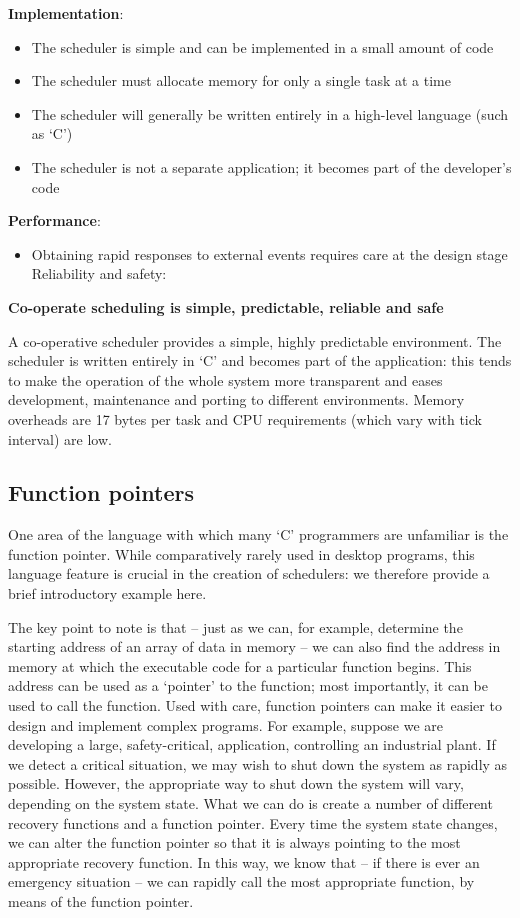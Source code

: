 \documentclass[twoside, final]{hcmut_report}
\begin{document}
\textbf{Implementation}:
\begin{itemize}
    \item The scheduler is simple and can be implemented in a small amount of code
    \item The scheduler must allocate memory for only a single task at a time
    \item The scheduler will generally be written entirely in a high-level language (such as ‘C’)
   \item The scheduler is not a separate application; it becomes part of the developer’s code
\end{itemize}


\textbf{Performance}:
\begin{itemize}
    \item Obtaining rapid responses to external events requires care at the design stage
Reliability and safety:

\end{itemize}

\textbf{Co-operate scheduling is simple, predictable, reliable and safe}

A co-operative scheduler provides a simple, highly predictable environment. The
scheduler is written entirely in ‘C’ and becomes part of the application: this tends to
make the operation of the whole system more transparent and eases development,
maintenance and porting to different environments. Memory overheads are 17
bytes per task and CPU requirements (which vary with tick interval) are low.

\subsection{Function pointers}
One area of the language with which many `C' programmers are unfamiliar is the
function pointer. While comparatively rarely used in desktop programs, this language
feature is crucial in the creation of schedulers: we therefore provide a brief introductory example here.

The key point to note is that – just as we can, for example, determine the starting
address of an array of data in memory – we can also find the address in memory at
which the executable code for a particular function begins. This address can be used
as a ‘pointer’ to the function; most importantly, it can be used to call the function.
Used with care, function pointers can make it easier to design and implement complex programs. For example, suppose we are developing a large, safety-critical,
application, controlling an industrial plant. If we detect a critical situation, we may
wish to shut down the system as rapidly as possible. However, the appropriate way to
shut down the system will vary, depending on the system state. What we can do is
create a number of different recovery functions and a function pointer. Every time
the system state changes, we can alter the function pointer so that it is always pointing to the most appropriate recovery function. In this way, we know that – if there is
ever an emergency situation – we can rapidly call the most appropriate function, by
means of the function pointer.
\end{document}
